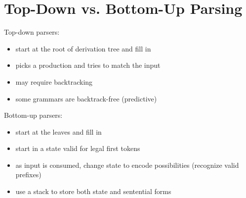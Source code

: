 \documentclass[10pt]{article}
\begin{document}
\section*{Top-Down vs. Bottom-Up Parsing}
Top-down parsers:
\begin{itemize}
    \item start at the root of derivation tree and fill in
    \item picks a production and tries to match the input
    \item may require backtracking
    \item some grammars are backtrack-free (predictive)
\end{itemize}
Bottom-up parsers:
\begin{itemize}
    \item start at the leaves and fill in
    \item start in a state valid for legal first tokens
    \item as input is consumed, change state to encode possibilities (recognize valid prefixes)
    \item use a stack to store both state and sentential forms
\end{itemize}
\end{document}
